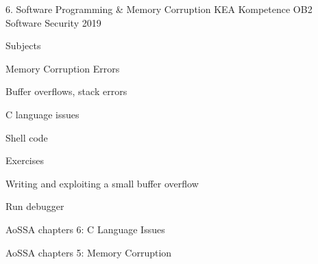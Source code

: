 \documentclass[Screen16to9,17pt]{foils}
\begin{document}
\mytitlepage
{6. Software Programming \& Memory Corruption}
{KEA Kompetence OB2 Software Security 2019}


\begin{list1}
\item Subjects
\begin{list2}
\item Memory Corruption Errors
\item Buffer overflows, stack errors
\item C language issues
\item Shell code
\end{list2}
\item Exercises
\begin{list2}
\item Writing and exploiting a small buffer overflow
\item Run debugger
\end{list2}
\end{list1}


\begin{list1}
\item AoSSA chapters 6: C Language Issues
\item AoSSA chapters 5: Memory Corruption
\end{list1}



\begin{list1}
\item
\end{list1}


\end{document}
